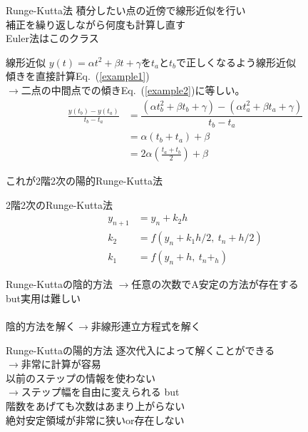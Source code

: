 \documentclass[unicode, 12pt, aspectratio=169]{beamer}
\newcommand{\eref}[1]{Eq.~(\ref{#1})}
\begin{document}
\begin{frame}
    \begin{block}{Runge-Kutta法}
    積分したい点の近傍で線形近似を行い\\
    補正を繰り返しながら何度も計算し直す\\
    Euler法はこのクラス
    \end{block}
    \begin{block}{線形近似}
    $y(t) = \alpha t^2+\beta t+\gamma$を$t_a$と$t_b$で正しくなるよう線形近似\\
    傾きを直接計算\eref{example1}\\
    $\rightarrow$二点の中間点での傾き\eref{example2}に等しい。
    \begin{align}
      \frac{y(t_b)-y(t_a)}{t_b-t_a}&=\dfrac{(\alpha t_b^2+\beta t_b+\gamma)-(\alpha t^2_a+\beta t_a+\gamma)}{t_b-t_a} \nonumber \\
      &=\alpha (t_b+t_a) + \beta\label{example1}\\
      &=2\alpha\left(\frac{t_a + t_b}{2}\right) + \beta \label{example2}
    \end{align}
    \end{block}
\end{frame}

\begin{frame}
    これが2階2次の陽的Runge-Kutta法
    \begin{block}{2階2次のRunge-Kutta法}
      \begin{align}
        y_{n+1}&=y_n + k_2h\\
        k_2&=f(y_n+k_1h/2,\:t_n+h/2)\\
        k_1&=f(y_n+h,\:t_n+_h)
      \end{align}
    \end{block}
\end{frame}

\begin{frame}
  \begin{block}{Runge-Kuttaの陰的方法}
    $\rightarrow$任意の次数でA安定の方法が存在する\\
    \alert{but}実用は難しい\\
    \\
    陰的方法を解く$\rightarrow$非線形連立方程式を解く
  \end{block}
  \begin{block}{Runge-Kuttaの陽的方法}
    逐次代入によって解くことができる\\
    $\rightarrow$非常に計算が容易\\
    以前のステップの情報を使わない\\
    $\rightarrow$ステップ幅を自由に変えられる
    \alert{but}\\
    階数をあげても次数はあまり上がらない\\
    絶対安定領域が非常に狭いor存在しない\\
  \end{block}
\end{frame}
\end{document}
